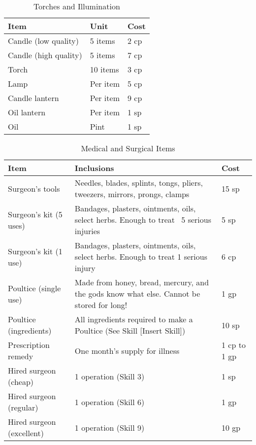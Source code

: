 \documentclass[oneside,11pt,english]{book}
\begin{document}
\begin{table}[hb]
  \centering
  \caption{Torches and Illumination}
  \label{tab:Torches and Illumination}
  \begin{tabu} spread 0pt {*{3}{X[-1]}}
    Item                  & Unit     & Cost \\\toprule
    Candle (low quality)  & 5 items  & 2 cp \\
    Candle (high quality) & 5 items  & 7 cp \\
    Torch                 & 10 items & 3 cp \\
    Lamp                  & Per item & 5 cp \\
    Candle lantern        & Per item & 9 cp \\
    Oil lantern           & Per item & 1 sp \\
    Oil                   & Pint     & 1 sp \\
  \end{tabu}
\end{table}

\begin{table}[hb]
  \centering
  \caption{Medical and Surgical Items}
  \label{tab:Medical and Surgical Items}
  \begin{tabu} spread 0pt {*{3}{X[-1]}}
    Item                      & Inclusions                                                                               & Cost         \\\toprule
    Surgeon’s tools           & Needles, blades, splints, tongs, pliers, tweezers, mirrors, prongs, clamps               & 15 sp        \\
    Surgeon’s kit (5 uses)    & Bandages, plasters, ointments, oils, select herbs. Enough to treat ~5 serious injuries   & 5 sp         \\
    Surgeon’s kit (1 use)     & Bandages, plasters, ointments, oils, select herbs. Enough to treat 1 serious injury      & 6 cp         \\
    Poultice (single use)     & Made from honey, bread, mercury, and the gods know what else. Cannot be stored for long! & 1 gp         \\
    Poultice (ingredients)    & All ingredients required to make a Poultice (See Skill [Insert Skill])                   & 10 sp        \\
    Prescription remedy       & One month’s supply for illness                                                           & 1 cp to 1 gp \\
    Hired surgeon (cheap)     & 1 operation (Skill 3)                                                                    & 1 sp         \\
    Hired surgeon (regular)   & 1 operation (Skill 6)                                                                    & 1 gp         \\
    Hired surgeon (excellent) & 1 operation (Skill 9)                                                                    & 10 gp        \\
  \end{tabu}
\end{table}
\end{document}
